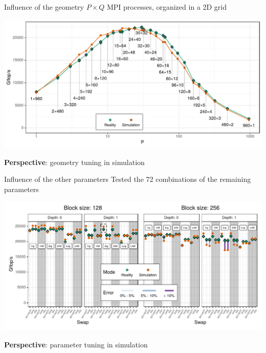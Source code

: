 \documentclass[10pt]{beamer}
\begin{document}
\begin{frame}{Influence of the geometry}
    \(P \times Q\) MPI processes, organized in a 2D grid

    \begin{center}
        \includegraphics[width=0.9\linewidth]{img/slides/validation_geometry.pdf}
    \end{center}

    \textbf{Perspective}: geometry tuning in simulation
\end{frame}

\begin{frame}{Influence of the other parameters}
    Tested the 72 combinations of the remaining parameters
    \begin{center}
        \includegraphics[width=0.9\linewidth]{img/prediction/validation/factorial/validation_factorial.pdf}
    \end{center}

    \textbf{Perspective}: parameter tuning in simulation
\end{frame}
\end{document}
